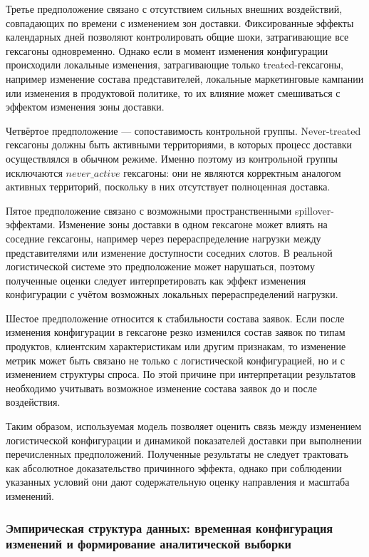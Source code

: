 \documentclass[14pt,a4paper]{extarticle}
\begin{document}
Третье предположение связано с отсутствием сильных внешних воздействий, совпадающих по времени с изменением зон доставки. Фиксированные эффекты календарных дней позволяют контролировать общие шоки, затрагивающие все гексагоны одновременно. Однако если в момент изменения конфигурации происходили локальные изменения, затрагивающие только treated-гексагоны, например изменение состава представителей, локальные маркетинговые кампании или изменения в продуктовой политике, то их влияние может смешиваться с эффектом изменения зоны доставки.

Четвёртое предположение --- сопоставимость контрольной группы. Never-treated гексагоны должны быть активными территориями, в которых процесс доставки осуществлялся в обычном режиме. Именно поэтому из контрольной группы исключаются \(never\_active\) гексагоны: они не являются корректным аналогом активных территорий, поскольку в них отсутствует полноценная доставка.

Пятое предположение связано с возможными пространственными spillover-эффектами. Изменение зоны доставки в одном гексагоне может влиять на соседние гексагоны, например через перераспределение нагрузки между представителями или изменение доступности соседних слотов. В реальной логистической системе это предположение может нарушаться, поэтому полученные оценки следует интерпретировать как эффект изменения конфигурации с учётом возможных локальных перераспределений нагрузки.

Шестое предположение относится к стабильности состава заявок. Если после изменения конфигурации в гексагоне резко изменился состав заявок по типам продуктов, клиентским характеристикам или другим признакам, то изменение метрик может быть связано не только с логистической конфигурацией, но и с изменением структуры спроса. По этой причине при интерпретации результатов необходимо учитывать возможное изменение состава заявок до и после воздействия.

Таким образом, используемая модель позволяет оценить связь между изменением логистической конфигурации и динамикой показателей доставки при выполнении перечисленных предположений. Полученные результаты не следует трактовать как абсолютное доказательство причинного эффекта, однако при соблюдении указанных условий они дают содержательную оценку направления и масштаба изменений.

\subsubsection{Эмпирическая структура данных: временная конфигурация изменений и формирование аналитической выборки}
\end{document}
